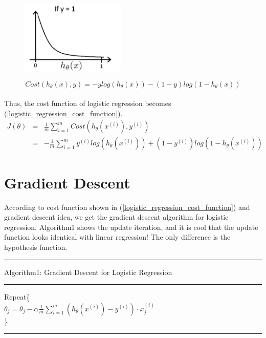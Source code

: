\documentclass{article}
\begin{document}
\begin{figure}[ht]
  \centering
  \includegraphics[width=5cm]{Figure4.jpg}\\
  \caption{}\label{cost_fuction_log_plot}
\end{figure}

\begin{equation}\label{simple_logistic_regression_example_cost_function}
Cost(h_{\theta}(x), y) = -ylog(h_{\theta}(x)) - (1 - y)log(1 - h_{\theta}(x))
\end{equation}
\\
Thus, the cost function of logistic regression becomes (\ref{logistic_regression_cost_function}).
\begin{eqnarray}\label{logistic_regression_cost_function}
  J(\theta) &   =   &\frac{1}{m} \sum_{i=1}^{m} Cost(h_{\theta}(x^{(i)}), y^{(i)})\\
            &   =   &-\frac{1}{m} \sum_{i=1}^{m} y^{(i)}log(h_{\theta}(x^{(i)})) + (1 - y^{(i)})log(1 - h_{\theta}(x^{(i)}))
\end{eqnarray}

\section{Gradient Descent}
According to cost function shown in (\ref{logistic_regression_cost_function}) and gradient descent idea, we get the gradient descent algorithm for logistic regression. Algorithm1 shows the update iteration, and it is cool that the update function looks identical with linear regression! The only difference is the hypothesis function.
\smallskip
\hrule
\smallskip
Algorithm1: Gradient Descent for Logistic Regression
\smallskip
\hrule
\smallskip
Repeat\{\\
$\theta_j=\theta_j - \alpha \frac{1}{m} \sum_{i=1}^{m}(h_\theta(x^{(i)})-y^{(i)}) \cdot x^{(i)}_{j}$\\
\}\\
\hrule
\end{document}
